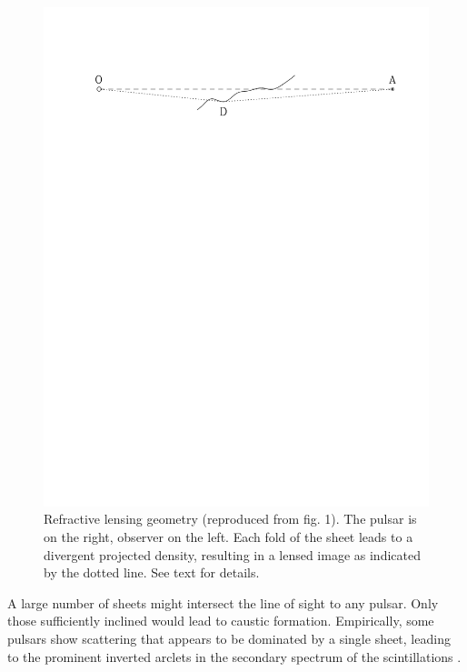 \documentclass[useAMS,usenatbib]{mn2e}
\begin{document}
\begin{figure}
\vspace{-0.8in}
\includegraphics[width=1.0\textwidth, angle=0]{sheetgeom.pdf}
\vspace{-7.0in}
\caption{Refractive lensing geometry 
(reproduced from \citet{2014MNRAS.442.3338P}
  fig. 1).  The pulsar is on the right, observer on the left.  Each
  fold of the sheet leads to a divergent projected density, resulting
  in a lensed image as indicated by the dotted line. See text for details.
}
\label{fig:sheetgeom}
\end{figure}



A large number of sheets might intersect the line of sight to any
pulsar.  Only those sufficiently inclined would lead to caustic
formation.  Empirically, some pulsars show scattering that appears to be dominated by a
single sheet, leading to the prominent inverted
arclets in the secondary spectrum of the scintillations \citep{2001ApJ...549L..97S}.
\end{document}
